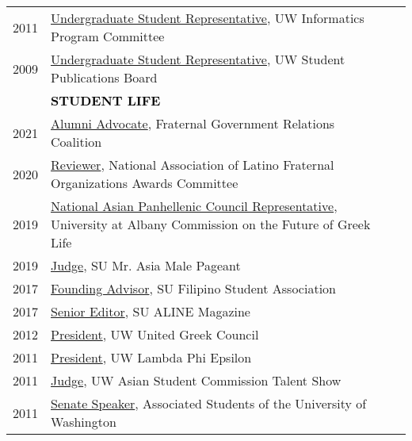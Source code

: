 \documentclass[11pt]{article}
\begin{document}
{{\begin{longtable}{Rp{0.75in}p{5.0in}}
\footnotesize{2011} & \href{https://ischool.uw.edu/about/leadership}{Undergraduate Student Representative}, UW Informatics Program Committee\\

\footnotesize{2009} & \href{https://en.wikipedia.org/wiki/The_Daily_of_the_University_of_Washington}{Undergraduate Student Representative}, UW Student Publications Board\\

& \textcolor{black}{\uppercase{\textbf{Student Life}}}\\
\footnotesize{2021} & 
 \href{http://www.fgrc.com/}{Alumni Advocate}, Fraternal Government Relations Coalition\\

\footnotesize{2020} & 
 \href{https://nalfo.org/nalfo-awards/}{Reviewer}, National Association of Latino Fraternal Organizations Awards Committee\\

\footnotesize{2019} & 
 \href{https://www.albany.edu/studentaffairs/commission_members.shtml}{National Asian Panhellenic Council Representative}, University at Albany Commission on the Future of Greek Life\\

\footnotesize{2019} & 
 \href{https://ese.syr.edu/multicultural/calendar/asian-american-and-pacific-islander-heritage-month/}{Judge}, SU Mr. Asia Male Pageant\\

\footnotesize{2017} & 
 \href{https://www.facebook.com/syracusefsa/}{Founding Advisor}, SU Filipino Student Association\\

\footnotesize{2017} & \href{https://issuu.com/alinemagazine}{Senior Editor}, SU ALINE Magazine\\

\footnotesize{2012} & \href{https://www.dailyuw.com/news/article_3c781595-0b4d-52be-9a6e-b2c956ae72eb.html}{President}, UW United Greek Council\\

\footnotesize{2011} & \href{https://uwlambdas.com/}{President}, UW Lambda Phi Epsilon\\

\footnotesize{2011} & \href{https://www.facebook.com/events/972221256174460/}{Judge}, UW Asian Student Commission Talent Show\\

\footnotesize{2011} & \href{http://www.dailyuw.com/news/article_da48b049-d2a0-582c-9dfb-4589755ff1e5.html}{Senate Speaker}, Associated Students of the University of Washington\\


\end{longtable}}}
\end{document}
